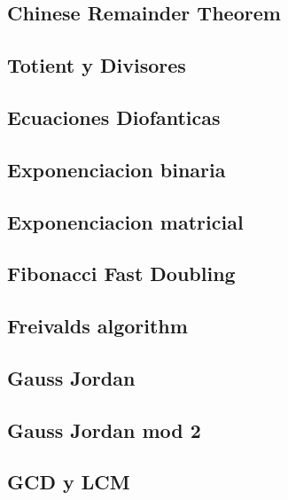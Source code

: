 \subsection{Chinese Remainder Theorem}
\raggedbottom
\hrulefill
\subsection{Totient y Divisores}
\raggedbottom
\hrulefill
\subsection{Ecuaciones Diofanticas}
\raggedbottom
\hrulefill
\subsection{Exponenciacion binaria}
\raggedbottom
\hrulefill
\subsection{Exponenciacion matricial}
\raggedbottom
\hrulefill
\subsection{Fibonacci Fast Doubling}
\raggedbottom
\hrulefill
\subsection{Freivalds algorithm}
\raggedbottom
\hrulefill
\subsection{Gauss Jordan}
\raggedbottom
\hrulefill
\subsection{Gauss Jordan mod 2}
\raggedbottom
\hrulefill
\subsection{GCD y LCM}
\raggedbottom
\hrulefill
